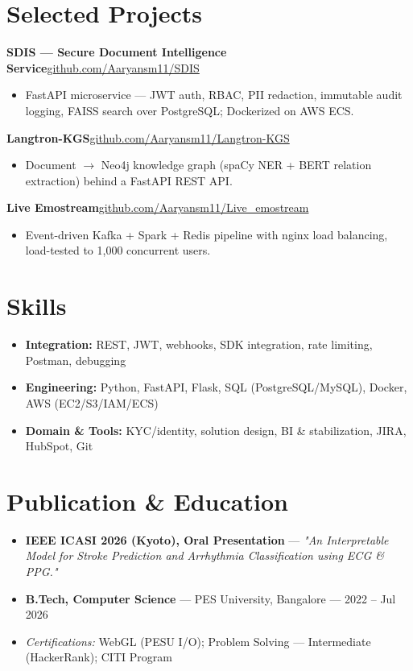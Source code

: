\documentclass[10pt,a4paper]{article}
\begin{document}
\section*{Selected Projects}
\vspace{1pt}\textbf{SDIS --- Secure Document Intelligence Service}\hfill {\small\href{https://github.com/Aaryansm11/SDIS}{github.com/Aaryansm11/SDIS}}
\begin{itemize}
\item FastAPI microservice --- JWT auth, RBAC, PII redaction, immutable audit logging, FAISS search over PostgreSQL; Dockerized on AWS ECS.
\end{itemize}
\vspace{1pt}\textbf{Langtron-KGS}\hfill {\small\href{https://github.com/Aaryansm11/Langtron-KGS}{github.com/Aaryansm11/Langtron-KGS}}
\begin{itemize}
\item Document $\rightarrow$ Neo4j knowledge graph (spaCy NER + BERT relation extraction) behind a FastAPI REST API.
\end{itemize}
\vspace{1pt}\textbf{Live Emostream}\hfill {\small\href{https://github.com/Aaryansm11/Live_emostream}{github.com/Aaryansm11/Live\_emostream}}
\begin{itemize}
\item Event-driven Kafka + Spark + Redis pipeline with nginx load balancing, load-tested to 1,000 concurrent users.
\end{itemize}
\section*{Skills}
\begin{itemize}
\item \textbf{Integration:} REST, JWT, webhooks, SDK integration, rate limiting, Postman, debugging
\item \textbf{Engineering:} Python, FastAPI, Flask, SQL (PostgreSQL/MySQL), Docker, AWS (EC2/S3/IAM/ECS)
\item \textbf{Domain \& Tools:} KYC/identity, solution design, BI \& stabilization, JIRA, HubSpot, Git
\end{itemize}
\section*{Publication \& Education}
\begin{itemize}
\item \textbf{IEEE ICASI 2026 (Kyoto), Oral Presentation} --- \textit{"An Interpretable Model for Stroke Prediction and Arrhythmia Classification using ECG \& PPG."}
\item \textbf{B.Tech, Computer Science} --- PES University, Bangalore --- 2022 -- Jul 2026
\item \textit{Certifications:} WebGL (PESU I/O); Problem Solving --- Intermediate (HackerRank); CITI Program
\end{itemize}
\end{document}
